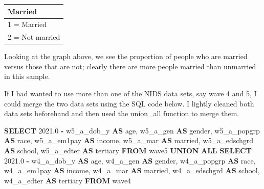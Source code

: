 \documentclass[11pt,preprint, authoryear]{elsarticle}
\numberwithin{equation}{section}
\numberwithin{figure}{section}
\numberwithin{table}{section}
\newenvironment{Shaded}{\begin{snugshade}}{\end{snugshade}}
\newcommand{\FloatTok}[1]{\textcolor[rgb]{0.00,0.00,0.81}{#1}}
\newcommand{\KeywordTok}[1]{\textcolor[rgb]{0.13,0.29,0.53}{\textbf{#1}}}
\newcommand{\NormalTok}[1]{#1}
\newcommand{\OperatorTok}[1]{\textcolor[rgb]{0.81,0.36,0.00}{\textbf{#1}}}
\begin{document}
\begin{tabular}{l}
\hline
Married\\
\hline
1 = Married\\
\hline
2 = Not married\\
\hline
\end{tabular}

Looking at the graph above, we see the proportion of people who are
married versus those that are not; clearly there are more people married
than unmarried in this sample.

If I had wanted to use more than one of the NIDS data sets, say wave 4
and 5, I could merge the two data sets using the SQL code below. I
lightly cleaned both data sets beforehand and then used the union\_all
function to merge them.

\begin{Shaded}
\begin{Highlighting}[]
\KeywordTok{SELECT} \FloatTok{2021.0} \OperatorTok{{-}}\NormalTok{ \textasciigrave{}w5\_a\_dob\_y\textasciigrave{} }\KeywordTok{AS}\NormalTok{ \textasciigrave{}age\textasciigrave{}, \textasciigrave{}w5\_a\_gen\textasciigrave{} }\KeywordTok{AS}\NormalTok{ \textasciigrave{}gender\textasciigrave{}, }
\NormalTok{\textasciigrave{}w5\_a\_popgrp\textasciigrave{} }\KeywordTok{AS}\NormalTok{ \textasciigrave{}race\textasciigrave{}, \textasciigrave{}w5\_a\_em1pay\textasciigrave{} }\KeywordTok{AS}\NormalTok{ \textasciigrave{}income\textasciigrave{}, }
\NormalTok{\textasciigrave{}w5\_a\_mar\textasciigrave{} }\KeywordTok{AS}\NormalTok{ \textasciigrave{}married\textasciigrave{}, \textasciigrave{}w5\_a\_edschgrd\textasciigrave{} }\KeywordTok{AS}\NormalTok{ \textasciigrave{}school\textasciigrave{}, }
\NormalTok{\textasciigrave{}w5\_a\_edter\textasciigrave{} }\KeywordTok{AS}\NormalTok{ \textasciigrave{}tertiary\textasciigrave{} }\KeywordTok{FROM}\NormalTok{ \textasciigrave{}wave5\textasciigrave{}}
\KeywordTok{UNION} \KeywordTok{ALL}
\KeywordTok{SELECT} \FloatTok{2021.0} \OperatorTok{{-}}\NormalTok{ \textasciigrave{}w4\_a\_dob\_y\textasciigrave{} }\KeywordTok{AS}\NormalTok{ \textasciigrave{}age\textasciigrave{}, \textasciigrave{}w4\_a\_gen\textasciigrave{} }\KeywordTok{AS}\NormalTok{ \textasciigrave{}gender\textasciigrave{}, }
\NormalTok{\textasciigrave{}w4\_a\_popgrp\textasciigrave{} }\KeywordTok{AS}\NormalTok{ \textasciigrave{}race\textasciigrave{}, \textasciigrave{}w4\_a\_em1pay\textasciigrave{} }\KeywordTok{AS}\NormalTok{ \textasciigrave{}income\textasciigrave{}, }
\NormalTok{\textasciigrave{}w4\_a\_mar\textasciigrave{} }\KeywordTok{AS}\NormalTok{ \textasciigrave{}married\textasciigrave{}, \textasciigrave{}w4\_a\_edschgrd\textasciigrave{} }\KeywordTok{AS}\NormalTok{ \textasciigrave{}school\textasciigrave{}, }
\NormalTok{\textasciigrave{}w4\_a\_edter\textasciigrave{} }\KeywordTok{AS}\NormalTok{ \textasciigrave{}tertiary\textasciigrave{} }\KeywordTok{FROM}\NormalTok{ \textasciigrave{}wave4\textasciigrave{}}
\end{Highlighting}
\end{Shaded}
\end{document}
